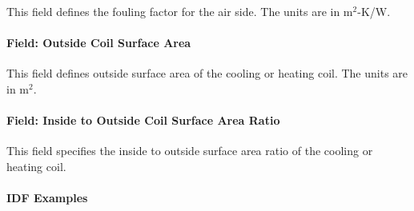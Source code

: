 This field defines the fouling factor for the air side. The units are in m\(^{2}\)-K/W.

\paragraph{Field: Outside Coil Surface Area}\label{field-outside-coil-surface-area}

This field defines outside surface area of the cooling or heating coil. The units are in m\(^{2}\).

\paragraph{Field: Inside to Outside Coil Surface Area Ratio}\label{field-inside-to-outside-coil-surface-area-ratio}

This field specifies the inside to outside surface area ratio of the cooling or heating coil.

\paragraph{IDF Examples}

